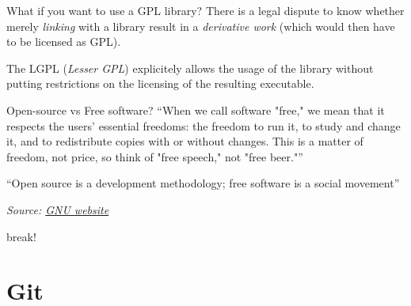 \documentclass[compress]{beamer}
\newcommand{\source}[2]{{\tiny\it Source: \href{#1}{#2}}}
\begin{document}
\begin{frame}{What if you want to use a GPL library?}
    There is a legal dispute to know whether merely \emph{linking} with a
    library result in a \emph{derivative work} (which would then have to be
    licensed as GPL).

    \pause

    The LGPL (\emph{Lesser GPL}) explicitely allows the usage of the library
    without putting restrictions on the licensing of the resulting executable.

\end{frame}

\begin{frame}{}

    \begin{exampleblock}{Open-source vs Free software?}
    ``When we call software "free," we mean that it respects the users' essential
    freedoms: the freedom to run it, to study and change it, and to redistribute
    copies with or without changes. This is a matter of freedom, not price, so
    think of "free speech," not "free beer."''

        \vspace{1em}
    ``Open source is a development methodology; free software is a social
        movement''

    \end{exampleblock}

    \source{https://www.gnu.org/philosophy/open-source-misses-the-point.en.html}{GNU
    website}
\end{frame}

\begin{frame}[plain]
    \begin{center}
        \Large
        break!\\[2em]
    \end{center}
\end{frame}

\section{Git}

\end{document}
